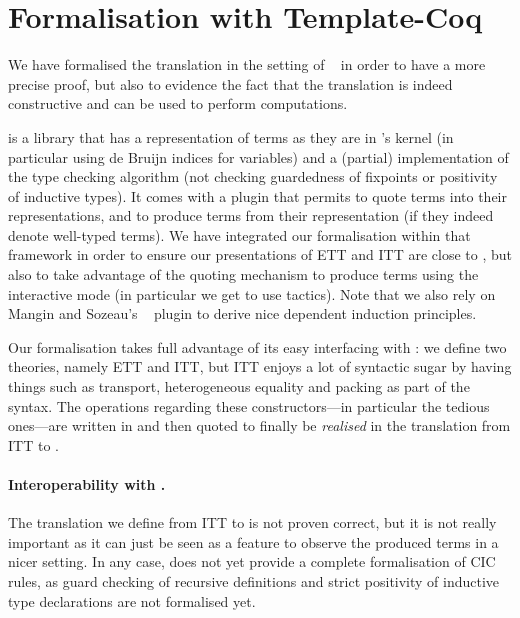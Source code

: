 \section{Formalisation with Template-Coq}
\label{sec:form-with-templ}

We have formalised the translation
in the setting of \TemplateCoq~ in order to have
a more precise proof, but also to evidence the fact that the translation is
indeed constructive and can be used to perform computations.

\TemplateCoq is a \Coq library that has a representation of \Coq terms
as they are in \Coq's kernel (in particular using de Bruijn indices for
variables) and a (partial) implementation of the type checking algorithm
(not checking guardedness of fixpoints or positivity of inductive types).
%
It comes with a \Coq plugin that permits to quote \Coq terms into their
representations, and to produce \Coq terms from their representation
(if they indeed denote well-typed terms).
%
We have integrated our formalisation within that framework in order to
ensure our presentations of ETT and ITT are close to \Coq, but also to
take advantage of the quoting mechanism to produce terms using
the interactive mode (in particular we get to use tactics).
%
Note that we also rely on Mangin and Sozeau's
\Equations{}~ plugin to derive nice
dependent induction principles.

Our formalisation takes full advantage of its easy interfacing with \TemplateCoq:
we define two theories, namely ETT and ITT, but ITT enjoys a lot of syntactic
sugar by having things such as transport, heterogeneous equality and packing as
part of the syntax. The operations regarding these constructors---in particular
the tedious ones---are written in \Coq and then quoted to finally be
\emph{realised} in the translation from ITT to \TemplateCoq.

\paragraph{Interoperability with \TemplateCoq.}
The translation we define from ITT to \TemplateCoq is not proven
correct, but it is not really important as it can just be seen as a
feature to observe the produced terms in a nicer setting. In any case,
\TemplateCoq does not yet provide a complete formalisation of CIC rules,
as guard checking of recursive definitions and strict positivity of
inductive type declarations are not formalised yet.

